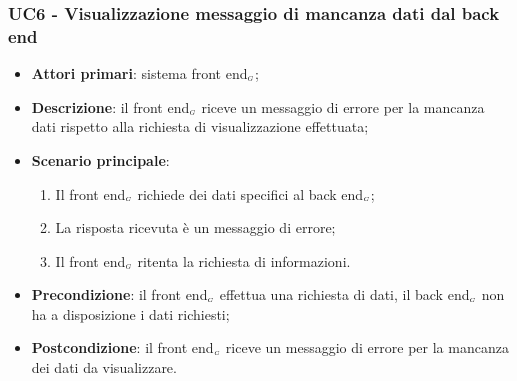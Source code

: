 \subsubsection{UC6 - Visualizzazione messaggio di mancanza dati dal back end}\label{VisualizzazioneMancanzaBackEnd}
\begin{itemize}
	\item \textbf{Attori primari}: sistema front end$_{\scaleto{G}{3pt}}$;
	\item \textbf{Descrizione}: il front end$_{\scaleto{G}{3pt}}$ riceve un messaggio di errore per la mancanza dati rispetto alla richiesta di visualizzazione effettuata;
	\item \textbf{Scenario principale}: 
	\begin{enumerate}
		\item Il front end$_{\scaleto{G}{3pt}}$ richiede dei dati specifici al back end$_{\scaleto{G}{3pt}}$;
		\item La risposta ricevuta è un messaggio di errore;
		\item Il front end$_{\scaleto{G}{3pt}}$ ritenta la richiesta di informazioni. 
	\end{enumerate}
	\item \textbf{Precondizione}: il front end$_{\scaleto{G}{3pt}}$ effettua una richiesta di dati, il back end$_{\scaleto{G}{3pt}}$ non ha a disposizione i dati richiesti;
	\item \textbf{Postcondizione}: il front end$_{\scaleto{G}{3pt}}$ riceve un messaggio di errore per la mancanza dei dati da visualizzare. 
\end{itemize}

